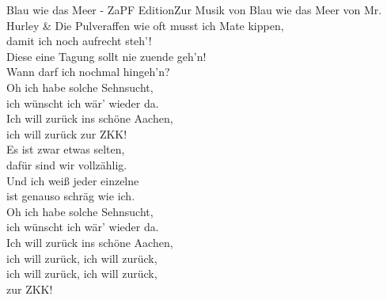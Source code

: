 \begin{lied} {Blau wie das Meer - ZaPF Edition}{Zur Musik von Blau wie das Meer von Mr. Hurley \& Die Pulveraffen}
wie oft musst ich Mate kippen, \\
damit ich noch aufrecht steh'! \\
\vspace{1em}
Diese eine Tagung sollt nie zuende geh'n! \\
Wann darf ich nochmal hingeh'n? \\
\vspace{1em}
Oh ich habe solche Sehnsucht, \\
ich wünscht ich wär' wieder da. \\
Ich will zurück ins schöne Aachen, \\
ich will zurück zur ZKK! \\
\vspace{1em}
Es ist zwar etwas selten, \\
dafür sind wir vollzählig. \\
Und ich weiß jeder einzelne \\
ist genauso schräg wie ich. \\
\vspace{1em}
Oh ich habe solche Sehnsucht, \\
ich wünscht ich wär' wieder da. \\
Ich will zurück ins schöne Aachen, \\
ich will zurück, ich will zurück, \\
ich will zurück, ich will zurück, \\
zur ZKK! \\
\end{lied}

